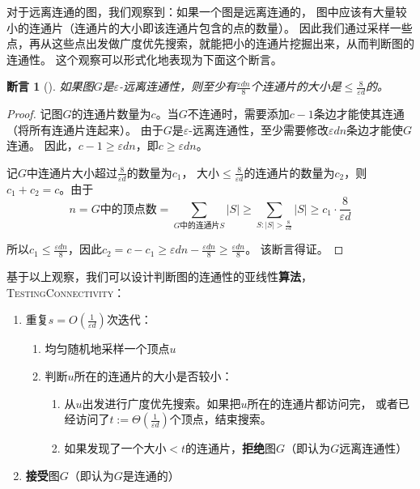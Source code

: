 \documentclass[lang=cn,newtx,10pt,scheme=chinese,chinesefont=nofont,citestyle=gb7714-2015, bibstyle=gb7714-2015]{elegantbook}
\newtheorem{claim}{断言}[chapter]   %
\begin{document}
\begin{refsection}
对于远离连通的图，我们观察到：如果一个图是远离连通的，
图中应该有大量较小的连通片（连通片的大小即该连通片包含的点的数量）。
因此我们通过采样一些点，再从这些点出发做广度优先搜索，就能把小的连通片挖掘出来，从而判断图的连通性。
这个观察可以形式化地表现为下面这个断言。
\begin{claim}[\cite{goldreich1997property}]\label{claim:smallCCs}
    如果图$G$是$\varepsilon$-远离连通性，则至少有$\frac{\varepsilon d n}{8}$个连通片的大小是$\le\frac{8}{\varepsilon d}$的。
\end{claim}

\begin{proof}
    记图$G$的连通片数量为$c$。当$G$不连通时，需要添加$c-1$条边才能使其连通（将所有连通片连起来）。
    由于$G$是$\varepsilon$-远离连通性，至少需要修改$\varepsilon dn$条边才能使$G$连通。
    因此，$c-1\ge\varepsilon dn$，即$c\ge\varepsilon dn$。

    记$G$中连通片大小超过$\frac{8}{\varepsilon d}$的数量为$c_1$，
    大小$\le\frac{8}{\varepsilon d}$的连通片的数量为$c_2$，则$c_1+c_2=c$。由于
    \[
    n=\text{$G$中的顶点数}=\sum_{\text{$G$中的连通片$S$}}|S|\ge\sum_{S:|S|>\frac{8}{\varepsilon d}}|S|\ge c_1\cdot\frac{8}{\varepsilon d}
    \]

    所以$c_1\le\frac{\varepsilon dn}{8}$，因此$c_2=c-c_1\ge \varepsilon dn-\frac{\varepsilon dn}{8}\ge\frac{\varepsilon dn}{8}$。
    该断言得证。
\end{proof}

基于以上观察，我们可以设计判断图的连通性的亚线性\textbf{算法}，\textsc{TestingConnectivity}：
\begin{enumerate}
    \item 重复$s=O(\frac{1}{\varepsilon d})$次迭代：
    \begin{enumerate}
        \item[1.1] 均匀随机地采样一个顶点$u$
        \item[1.2] 判断$u$所在的连通片的大小是否较小：
        \begin{enumerate}
            \item[1.2.1] 从$u$出发进行广度优先搜索。如果把$u$所在的连通片都访问完，
            或者已经访问了$t:=\Theta(\frac{1}{\varepsilon d})$个顶点，结束搜索。
            \item[1.2.2] 如果发现了一个大小$<t$的连通片，\textbf{拒绝}图$G$（即认为$G$远离连通性）
        \end{enumerate}
    \end{enumerate}
    \item \textbf{接受}图$G$（即认为$G$是连通的）
\end{enumerate}


\end{refsection}
\end{document}
